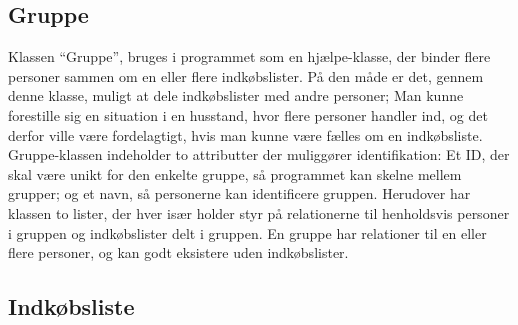 \subsection{Gruppe}
Klassen ``Gruppe'', bruges i programmet som en hjælpe-klasse, der binder flere personer sammen om en eller flere indkøbslister. 
På den måde er det, gennem denne klasse, muligt at dele indkøbslister med andre personer; 
Man kunne forestille sig en situation i en husstand, hvor flere personer handler ind, og det derfor ville være fordelagtigt, hvis man kunne være fælles om en indkøbsliste.
Gruppe-klassen indeholder to attributter der muliggører identifikation: Et ID, der skal være unikt for den enkelte gruppe, så programmet kan skelne mellem grupper; og et navn, så personerne kan identificere gruppen.
Herudover har klassen to lister, der hver især holder styr på relationerne til henholdsvis personer i gruppen og indkøbslister delt i gruppen.
En gruppe har relationer til en eller flere personer, og kan godt eksistere uden  indkøbslister.

\subsection{Indkøbsliste}
 
